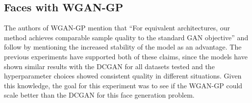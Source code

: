 \subsection{Faces with WGAN-GP}
The authors of \gls{WGAN-GP} mention that ``For equivalent architectures, our method achieves comparable sample quality to the standard GAN objective'' \cite{wgan-gp2017} and follow by mentioning the increased stability of the model as an advantage. The previous experiments have supported both of these claims, since the models have shown similar results with the DCGAN for all datasets tested and the hyperparameter choices showed consistent quality in different situations. Given this knowledge, the goal for this experiment was to see if the \gls{WGAN-GP} could scale better than the \gls{DCGAN} for this face generation problem.

